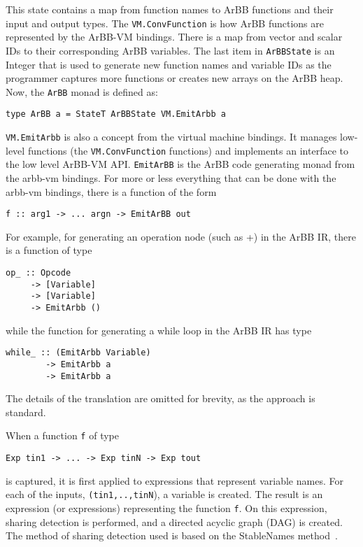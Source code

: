 This state contains a map from function names to ArBB functions and their input and 
output types. The {\tt VM.ConvFunction} is how ArBB functions are represented by 
the ArBB-VM bindings. There is a map from vector and scalar IDs to their 
corresponding ArBB variables. The last item in {\tt ArBBState} is an Integer 
that is used to generate new function names and variable IDs as the programmer 
captures more functions or creates new arrays on the ArBB heap. 
Now, the {\tt ArBB} monad is defined as: 

\begin{verbatim}
type ArBB a = StateT ArBBState VM.EmitArbb a  
\end{verbatim}

{\tt VM.EmitArbb} is also a concept from the virtual machine bindings. It manages 
low-level functions (the {\tt VM.ConvFunction} functions) and implements an interface to 
the low level ArBB-VM API. 
{\tt EmitArBB} is the ArBB code generating monad from the arbb-vm bindings.
For more or less everything that can be done with the arbb-vm bindings, there is a function
of the form 
\begin{verbatim}
f :: arg1 -> ... argn -> EmitArBB out
\end{verbatim}
For example, for generating an operation node (such as +) in the ArBB IR, there is a
function of type
\begin{verbatim}
op_ :: Opcode 
     -> [Variable] 
     -> [Variable] 
     -> EmitArbb ()
\end{verbatim}
\noindent
while the function for generating a while loop in the ArBB IR has type
\begin{verbatim}
while_ :: (EmitArbb Variable) 
        -> EmitArbb a 
        -> EmitArbb a
\end{verbatim}
The details of the translation are omitted for brevity, as the approach is
standard.

When a function {\tt f} of type 
\begin{verbatim}
Exp tin1 -> ... -> Exp tinN -> Exp tout
\end{verbatim}
is captured, it is 
first applied to expressions that represent variable names. For each of the 
inputs, {\tt (tin1,..,tinN}), a variable is created. The result is an expression 
(or expressions) representing the function {\tt f}. On this expression, sharing 
detection is performed, and a directed acyclic graph (DAG) is created. 
The method of sharing detection used is based on the StableNames method~\cite{Gill}. 

